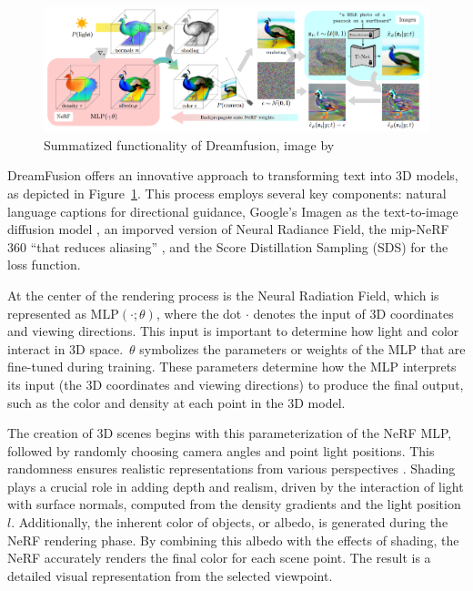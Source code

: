 \begin{figure}[ht]
  \centering
    \includegraphics[width=1\columnwidth]{figures/Dreamfusion.png}
    \caption{Summatized functionality of Dreamfusion, image by \citep{pooleDreamfusion}}\label{fig:figureDreamfusion}
  \end{figure}

DreamFusion offers an innovative approach to transforming text into 3D models, as depicted in Figure~\ref{fig:figureDreamfusion}. This process employs several key components: natural language captions for directional guidance, Google's Imagen as the text-to-image diffusion model \citep{saharia2022imagen}, an imporved version of Neural Radiance Field, the mip-NeRF 360 \citep{barron2022mipnerf} ``that reduces aliasing'' \citep{pooleDreamfusion}, and the Score Distillation Sampling (SDS) for the loss function.

At the center of the rendering process is the Neural Radiation Field, which is represented as \( \text{MLP}(\cdot; \theta) \), where the dot \(\cdot\) denotes the input of 3D coordinates and viewing directions. This input is important to determine how light and color interact in 3D space.~\(\theta\) symbolizes the parameters or weights of the MLP that are fine-tuned during training. These parameters determine how the MLP interprets its input (the 3D coordinates and viewing directions) to produce the final output, such as the color and density at each point in the 3D model.

The creation of 3D scenes begins with this parameterization of the NeRF MLP, followed by randomly choosing camera angles and point light positions. This randomness ensures realistic representations from various perspectives \citep{pooleDreamfusion}. Shading plays a crucial role in adding depth and realism, driven by the interaction of light with surface normals, computed from the density gradients and the light position \( l \). Additionally, the inherent color of objects, or albedo, is generated during the NeRF rendering phase. By combining this albedo with the effects of shading, the NeRF accurately renders the final color for each scene point. The result is a detailed visual representation from the selected viewpoint.

